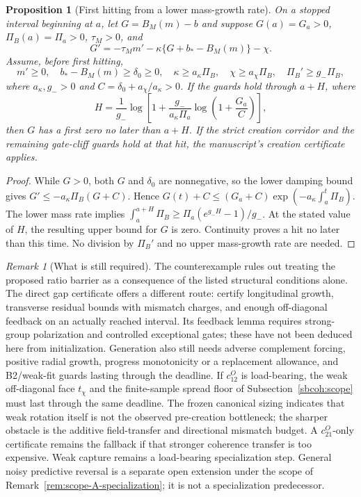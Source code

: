 \documentclass{article} %
\theoremstyle{plain}
\newtheorem{proposition}[theorem]{Proposition}
\theoremstyle{definition}
\theoremstyle{remark}
\newtheorem{remark}[theorem]{Remark}
\begin{document}
\begin{proposition}[First hitting from a lower mass-growth rate]
\label{sbgap:deadline}
On a stopped interval beginning at $a$, let $G=B_M(m)-b$ and suppose
$G(a)=G_a>0$, $\Pi_B(a)=\Pi_a>0$, $\tau_M>0$, and
\[
 G'=-\tau_M m'-\kappa\{G+b_*-B_M(m)\}-\chi.
\]
Assume, before first hitting,
\[
 m'\ge0,\quad b_*-B_M(m)\ge\delta_0\ge0,\quad
 \kappa\ge a_\kappa\Pi_B,\quad
 \chi\ge a_\chi\Pi_B,\quad
 \Pi_B'\ge g_-\Pi_B,
\]
where $a_\kappa,g_->0$ and $C=\delta_0+a_\chi/a_\kappa>0$.
If the guards hold through $a+H$, where
\begin{equation}\label{sbgap:deadline-eq}
 H=\frac1{g_-}\log\left[
 1+\frac{g_-}{a_\kappa\Pi_a}
           \log\left(1+\frac{G_a}{C}\right)\right],
\end{equation}
then $G$ has a first zero no later than $a+H$.
If the strict creation corridor and the remaining gate-cliff guards hold
at that hit, the manuscript's creation certificate applies.
\end{proposition}
\begin{proof}
While $G>0$, both $G$ and $\delta_0$ are nonnegative, so the lower damping
bound gives $G'\le-a_\kappa\Pi_B(G+C)$.
Hence
$G(t)+C\le(G_a+C)\exp(-a_\kappa\int_a^t\Pi_B)$.
The lower mass rate implies
$\int_a^{a+H}\Pi_B\ge\Pi_a(e^{g_-H}-1)/g_-$.
At the stated value of $H$, the resulting upper bound for $G$ is zero.
Continuity proves a hit no later than this time.
No division by $\Pi_B'$ and no upper mass-growth rate are needed.
\end{proof}

\begin{remark}[What is still required]
The counterexample rules out treating the proposed ratio barrier as a
consequence of the listed structural conditions alone.
The direct gap certificate offers a different route: certify longitudinal
growth, transverse residual bounds with mismatch charges, and enough
off-diagonal feedback on an actually reached interval.
Its feedback lemma requires strong-group polarization and controlled
exceptional gates; these have not been deduced here from initialization.
Generation also still needs adverse complement forcing, positive radial
growth, progress monotonicity or a replacement allowance, and B2/weak-fit
guards lasting through the deadline.  If $c_{12}^O$ is load-bearing, the
weak off-diagonal face $t_\chi$ and the finite-sample spread floor of
Subsection~\ref{sbcoh:scope} must last through the same deadline.  The frozen
canonical sizing indicates that weak rotation itself is not the observed
pre-creation bottleneck; the sharper obstacle is the additive field-transfer
and directional mismatch budget.  A $c_{21}^O$-only certificate remains the
fallback if that stronger coherence transfer is too expensive.  Weak capture remains a load-bearing specialization step.  General noisy
predictive reversal is a separate open extension under the scope of
Remark~\ref{rem:scope-A-specialization}; it is not a specialization
predecessor.
\end{remark}
\end{document}
